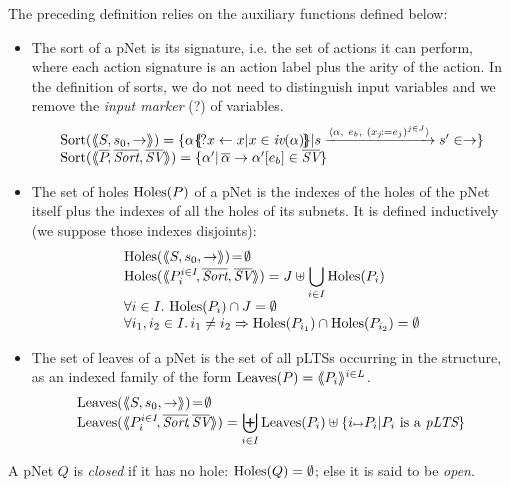 \documentclass{lncs/llncs}
\begin{document}
The preceding definition relies on the auxiliary functions defined below:

\begin{definition}\label{def-sortholeleave}
  \begin{itemize}
  \item The sort of a pNet is its signature, i.e. the set of actions it can
perform, where each action signature is an action 
label plus the arity of the action. In the definition of sorts, we do not need to 
distinguish
input variables and we remove the
\emph{input marker} (?) of variables.
\[
\begin{array}{l}
\Sortop(\mylangle S,s_0, \to\myrangle) = \{\alpha\subst{?x \gets x| 
x\in\symb{iv}(\alpha)}|s \xrightarrow{\langle \alpha,~e_b,~(x_j\!:= {e}_j)^{j\in
    J}\rangle} s'\in \to \} \\
\Sortop(\mylangle \set{\pNet}\!, %
\set{\Sort},
\set{\symb{SV}}\myrangle)
=\{\alpha' |\, \SV{\set{\alpha}}{\alpha'}{e_b}\in\set{\symb{SV}}\}
\end{array}
\]

\item
The set of holes $\operatorname{Holes}(P)$ of a pNet is the indexes of the holes of the pNet 
itself plus the indexes of all the holes of its subnets.
It is defined inductively (we suppose those indexes 
disjoints):
  \[\begin{array}{l}
\Holes(\mylangle S,s_0, \to\myrangle) \!=\! \emptyset\\
\Holes(\mylangle \pNet_i^{i\in I}\!,\set{\Sort}, \set{\symb{SV}}\myrangle) 
=J\uplus{\displaystyle \bigcup_{i\in 
I}\Holes(\pNet_i)}\\
\forall i\in I.\, \Holes(\pNet_i)\cap J=\emptyset\\
\forall i_1,i_2\in I.\,i_1\neq i_2\Rightarrow  \Holes(\pNet_{i_1})\cap\Holes(\pNet_{i_2})=\emptyset
\end{array}\]
\item
The set of leaves of a pNet is the set of all pLTSs occurring in the structure, as an 
indexed family of the form $\operatorname{Leaves}(P)= \langle\hspace{-0.58ex}\langle P_i \rangle\hspace{-0.58ex}\rangle^{i \in L}$.
\[\begin{array}{l}
\Leaves(\mylangle S,s_0, \to\myrangle) \!=\!\emptyset\\%
\Leaves(\mylangle \pNet_i^{i\in I}\!,%
\set{\Sort}\!, \set{\symb{SV}}\myrangle) = {\displaystyle \biguplus_{i\in 
I}\Leaves(\pNet_i)\uplus\{i\mapsto \pNet_i|\pNet_i \text{ is a }\pLTS\}}
\end{array}\]
\end{itemize}

A pNet $Q$ is \emph{closed} if it has no hole: $\operatorname{Holes}(Q)=\emptyset$; else it
is said to be \emph{open}.
\end{definition}
  
\end{document}
